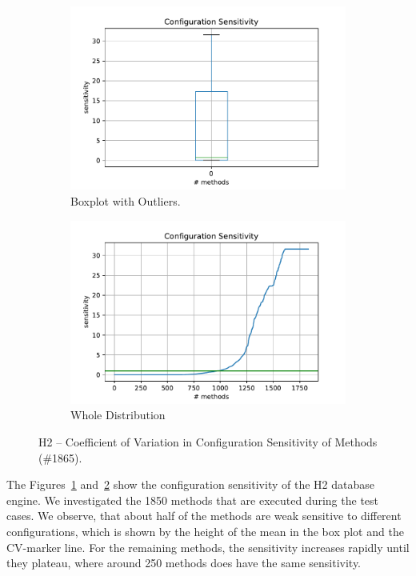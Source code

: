 \begin{figure}[h]
	\centering
	\begin{subfigure}{.5\textwidth}
	  \centering
	  \includegraphics[width=.99\linewidth]{images/H2_box_conf_sens_cv_with_outl}
	  \caption{Boxplot with Outliers.}
	  \label{fig:h_conf_sens_on_method:sub1}
	\end{subfigure}%
	\begin{subfigure}{.5\textwidth}
	  \centering
	  \includegraphics[width=.99\linewidth]{images/H2_plt_conf_sens_cv_with_outl}
	  \caption{Whole Distribution}
	  \label{fig:h_conf_sens_on_method:sub2}
	\end{subfigure}
	\caption{H2 -- Coefficient of Variation in Configuration Sensitivity of Methods (\#1865).}
	\label{fig:h_conf_sens_on_method}
\end{figure}

The Figures~\ref{fig:h_conf_sens_on_method:sub1} and~\ref{fig:h_conf_sens_on_method:sub2} show the configuration sensitivity of the H2 database engine. We investigated the 1850 methods that are executed during the test cases. We observe, that about half of the methods are weak sensitive to different configurations, which is shown by the height of the mean in the box plot and the \ac{CV}-marker line. For the remaining methods, the sensitivity increases rapidly until they plateau, where around 250 methods does have the same sensitivity. 

